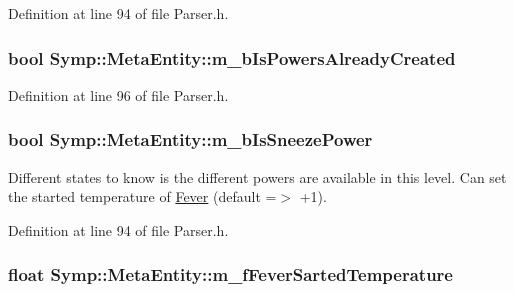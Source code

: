 Definition at line 94 of file Parser.\-h.

\hypertarget{struct_symp_1_1_meta_entity_a1727a3f308a073ac34e164ccd83a0838}{
\subsubsection[{m\-\_\-b\-Is\-Powers\-Already\-Created}]{\setlength{\rightskip}{0pt plus 5cm}bool Symp\-::\-Meta\-Entity\-::m\-\_\-b\-Is\-Powers\-Already\-Created}}\label{struct_symp_1_1_meta_entity_a1727a3f308a073ac34e164ccd83a0838}


Definition at line 96 of file Parser.\-h.

\hypertarget{struct_symp_1_1_meta_entity_abb18395677970e52429cff9fea1c3c49}{
\subsubsection[{m\-\_\-b\-Is\-Sneeze\-Power}]{\setlength{\rightskip}{0pt plus 5cm}bool Symp\-::\-Meta\-Entity\-::m\-\_\-b\-Is\-Sneeze\-Power}}\label{struct_symp_1_1_meta_entity_abb18395677970e52429cff9fea1c3c49}
Different states to know is the different powers are available in this level. Can set the started temperature of \hyperlink{class_symp_1_1_fever}{Fever} (default =$>$ +1). 

Definition at line 94 of file Parser.\-h.

\hypertarget{struct_symp_1_1_meta_entity_a8d7d76861eb81d12422422d4eafa621c}{
\subsubsection[{m\-\_\-f\-Fever\-Sarted\-Temperature}]{\setlength{\rightskip}{0pt plus 5cm}float Symp\-::\-Meta\-Entity\-::m\-\_\-f\-Fever\-Sarted\-Temperature}}\label{struct_symp_1_1_meta_entity_a8d7d76861eb81d12422422d4eafa621c}


